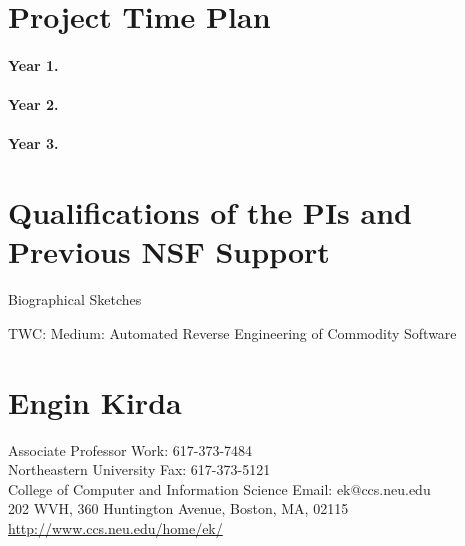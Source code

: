 \documentclass[letterpaper,twoside,11pt,headings=small]{scrartcl}
\newcommand{\basetitle}{TWC: Medium: Automated Reverse Engineering of Commodity Software}
\newcommand{\thetitle}{\basetitle\xspace}
\begin{document}

\section{Project Time Plan}
\label{sec:time-plan}

\paragraph{Year 1.}

\paragraph{Year 2.}

\paragraph{Year 3.}

\section{Qualifications of the PIs and Previous NSF Support}
\label{sec:qualifications}

\newpage
{}
\setcounter{page}{1}
\setcounter{section}{0}



\newpage
{}
\setcounter{page}{1}
\setcounter{section}{0}

{\sffamily\bfseries
\begin{center}
\fontsize{16}{16}\selectfont Biographical Sketches

\fontsize{13}{13}\selectfont \thetitle
\end{center}
\label{sec:biosketches}
}

\section{Engin Kirda}
\label{bio}

Associate Professor \hfill Work: 617-373-7484\\
Northeastern University \hfill Fax: 617-373-5121\\
College of Computer and Information Science \hfill Email: ek@ccs.neu.edu\\
202 WVH, 360 Huntington Avenue, Boston, MA, 02115 \hfill \url{http://www.ccs.neu.edu/home/ek/}
\end{document}
